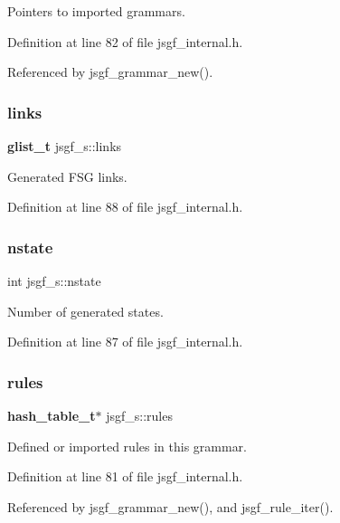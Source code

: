 Pointers to imported grammars. 



Definition at line 82 of file jsgf\+\_\+internal.\+h.



Referenced by jsgf\+\_\+grammar\+\_\+new().

\mbox{\label{structjsgf__s_a6ee31bac19680f01c413969a75ad838a}} 
\subsubsection{links}
{\footnotesize\ttfamily \textbf{ glist\+\_\+t} jsgf\+\_\+s\+::links}



Generated F\+SG links. 



Definition at line 88 of file jsgf\+\_\+internal.\+h.

\mbox{\label{structjsgf__s_a380c1b82e1bd776438303159e5129773}} 
\subsubsection{nstate}
{\footnotesize\ttfamily int jsgf\+\_\+s\+::nstate}



Number of generated states. 



Definition at line 87 of file jsgf\+\_\+internal.\+h.

\mbox{\label{structjsgf__s_af257160279ab56ffca65966aeac18ef9}} 
\subsubsection{rules}
{\footnotesize\ttfamily \textbf{ hash\+\_\+table\+\_\+t}$\ast$ jsgf\+\_\+s\+::rules}



Defined or imported rules in this grammar. 



Definition at line 81 of file jsgf\+\_\+internal.\+h.



Referenced by jsgf\+\_\+grammar\+\_\+new(), and jsgf\+\_\+rule\+\_\+iter().

